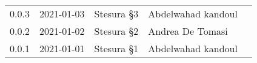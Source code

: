{\begin{longtable}{ c c  C{3.5cm}  C{4cm}  c }
        0.0.3                  & 2021-01-03                                       & Stesura §3                            & Abdelwahad kandoul & \verificatore{} \\
        0.0.2                  & 2021-01-02                                       & Stesura §2                              & Andrea De Tomasi & \verificatore{} \\
        0.0.1                  & 2021-01-01                                       & Stesura §1                            & Abdelwahad kandoul & \verificatore{} \\
    
    
    \end{longtable}
}
